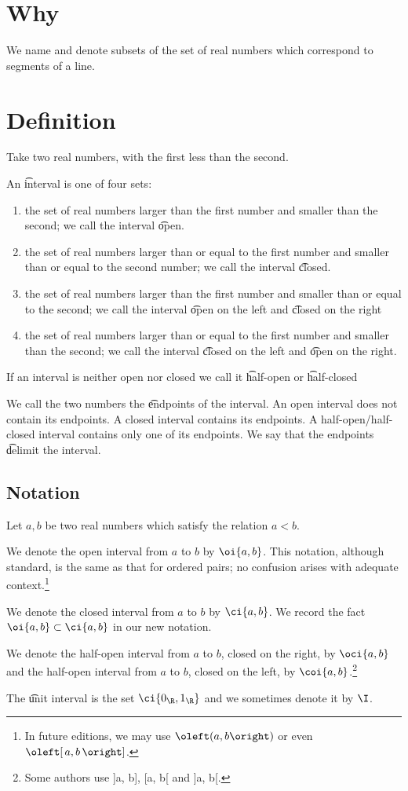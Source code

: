 
\section*{Why}

We name and denote subsets of the set of real numbers which correspond to segments of a line.

\section*{Definition}

Take two real numbers, with the first less than the second.

An \t{interval} is one of four sets:
    \begin{enumerate}
      \item the set of real numbers larger than the first number and smaller than the second; we call the interval \t{open}.
      \item the set of real numbers larger than or equal to the first number and smaller than or equal to the second number; we call the interval \t{closed}.
      \item the set of real numbers larger than the first number and smaller than or equal to the second; we call the interval \t{open on the left} and \t{closed on the right}
      \item the set of real numbers larger than or equal to the first number and smaller than the second; we call the interval \t{closed on the left} and \t{open on the right}.
    \end{enumerate}
If an interval is neither open nor closed we call it \t{half-open} or \t{half-closed}

We call the two numbers the \t{endpoints} of the interval.
An open interval does not contain its endpoints.
A closed interval contains its endpoints.
A half-open/half-closed interval contains only one of its endpoints.
We say that the endpoints \t{delimit} the interval.

\subsection*{Notation}

Let $a, b$ be two real numbers which satisfy the relation $a < b$.

We denote the open interval from $a$ to $b$ by $\oi{a, b}$.
This notation, although standard, is the same as that for ordered pairs; no confusion arises with adequate context.\footnote{In future editions, we may use $\oleft(a, b\oright)$ or even $\oleft[\,a, b\,\oright]$.}

We denote the closed interval from $a$ to $b$ by $\ci{a, b}$.
We record the fact $\oi{a, b} \subset \ci{a, b}$ in our new notation.

We denote the half-open interval from $a$ to $b$, closed on the right, by $\oci{a, b}$ and the half-open interval from $a$ to $b$, closed on the left, by $\coi{a, b}$.\footnote{Some authors use ]a, b], [a, b[ and ]a, b[.}

The \t{unit interval} is the set $\ci{0_{\R }, 1_{\R }}$ and we sometimes denote it by $\I$.
